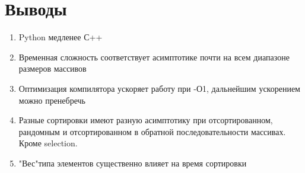 \documentclass[12pt,onecolumn]{article}
\begin{document}
\section{Выводы}
\begin{enumerate}
    \item Python медленее С++
    \item Временная сложность соответствует асимптотике почти на всем диапазоне размеров массивов
    \item Оптимизация компилятора ускоряет работу при -О1, дальнейшим ускорением можно пренебречь
    \item Разные сортировки имеют разную асимптотику при отсортированном, рандомным и отсортированном в обратной последовательности массивах. Кроме selection.
    \item "Вес"\hspace{3pt}типа элементов существенно влияет на время сортировки
\end{enumerate}
\end{document}

